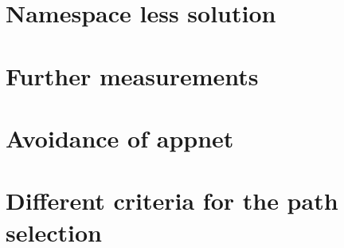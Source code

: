 \section*{Namespace less solution}

\section*{Further measurements}

\section*{Avoidance of appnet}

\section*{Different criteria for the path selection}

